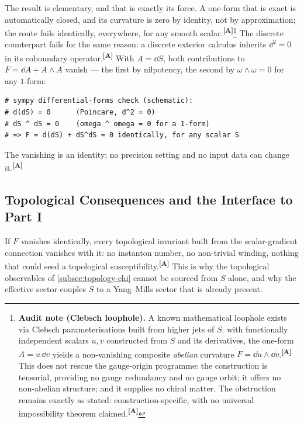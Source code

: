 \documentclass[12pt,a4paper,twoside]{article}
\theoremstyle{plain}
\theoremstyle{definition}
\theoremstyle{remark}
\newcommand{\catmark}[1]{\textsuperscript{\textsf{\textbf{[#1]}}}}
\begin{document}
\noindent The result is elementary, and that is exactly its force. A
one-form that is exact is automatically closed, and its curvature is
zero by identity, not by approximation; the route fails identically,
everywhere, for any smooth scalar.\catmark{A}\footnote{\textbf{Audit
note (Clebsch loophole).} A known mathematical loophole exists via
Clebsch parameterisations built from higher jets of $S$: with
functionally independent scalars $u,v$ constructed from $S$ and its
derivatives, the one-form $A = u\,\dd v$ yields a non-vanishing
composite \emph{abelian} curvature $F = \dd u \wedge \dd v$.\catmark{A}
This does not rescue the gauge-origin programme: the construction is
tensorial, providing no gauge redundancy and no gauge orbit; it offers
no non-abelian structure; and it supplies no chiral matter. The
obstruction remains exactly as stated: construction-specific, with no
universal impossibility theorem claimed.\catmark{A}} The discrete
counterpart fails for the same reason: a discrete exterior calculus
inherits $\dd^2 = 0$ in its coboundary operator.\catmark{A} With
$A=\dd S$, both contributions to $F = \dd A + A\wedge A$ vanish --- the
first by nilpotency, the second by $\omega\wedge\omega=0$ for any
$1$-form:
\begin{verbatim}
# sympy differential-forms check (schematic):
# d(dS) = 0      (Poincare, d^2 = 0)
# dS ^ dS = 0    (omega ^ omega = 0 for a 1-form)
# => F = d(dS) + dS^dS = 0 identically, for any scalar S
\end{verbatim}
The vanishing is an identity; no precision setting and no input data can
change it.\catmark{A}

\subsection{Topological Consequences and the Interface to Part I}
\label{subsec:topological-consequences}

If $F$ vanishes identically, every topological invariant built from the
scalar-gradient connection vanishes with it: no instanton number, no
non-trivial winding, nothing that could seed a topological
susceptibility.\catmark{A} This is why the topological observables of
\cref{subsec:topology-chi} cannot be sourced from $S$ alone, and why the
effective sector couples $S$ to a Yang--Mills sector that is already
present.
\end{document}
